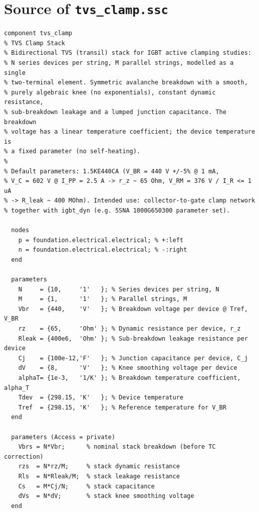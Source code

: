 \documentclass[11pt,a4paper]{article}
\begin{document}
\appendix
\section{Source of \texttt{tvs\_clamp.ssc}}
\label{app:code}

\begin{lstlisting}
component tvs_clamp
% TVS Clamp Stack
% Bidirectional TVS (transil) stack for IGBT active clamping studies:
% N series devices per string, M parallel strings, modelled as a single
% two-terminal element. Symmetric avalanche breakdown with a smooth,
% purely algebraic knee (no exponentials), constant dynamic resistance,
% sub-breakdown leakage and a lumped junction capacitance. The breakdown
% voltage has a linear temperature coefficient; the device temperature is
% a fixed parameter (no self-heating).
%
% Default parameters: 1.5KE440CA (V_BR = 440 V +/-5% @ 1 mA,
% V_C = 602 V @ I_PP = 2.5 A -> r_z ~ 65 Ohm, V_RM = 376 V / I_R <= 1 uA
% -> R_leak ~ 400 MOhm). Intended use: collector-to-gate clamp network
% together with igbt_dyn (e.g. 5SNA 1000G650300 parameter set).

  nodes
    p = foundation.electrical.electrical; % +:left
    n = foundation.electrical.electrical; % -:right
  end

  parameters
    N     = {10,     '1'   }; % Series devices per string, N
    M     = {1,      '1'   }; % Parallel strings, M
    Vbr   = {440,    'V'   }; % Breakdown voltage per device @ Tref, V_BR
    rz    = {65,     'Ohm' }; % Dynamic resistance per device, r_z
    Rleak = {400e6,  'Ohm' }; % Sub-breakdown leakage resistance per device
    Cj    = {100e-12,'F'   }; % Junction capacitance per device, C_j
    dV    = {8,      'V'   }; % Knee smoothing voltage per device
    alphaT= {1e-3,   '1/K' }; % Breakdown temperature coefficient, alpha_T
    Tdev  = {298.15, 'K'   }; % Device temperature
    Tref  = {298.15, 'K'   }; % Reference temperature for V_BR
  end

  parameters (Access = private)
    Vbrs = N*Vbr;      % nominal stack breakdown (before TC correction)
    rzs  = N*rz/M;     % stack dynamic resistance
    Rls  = N*Rleak/M;  % stack leakage resistance
    Cs   = M*Cj/N;     % stack capacitance
    dVs  = N*dV;       % stack knee smoothing voltage
  end


\end{lstlisting}
\end{document}
